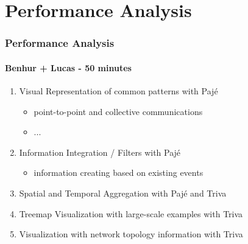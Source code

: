 \section{Performance Analysis}

\frame
{
  \frametitle{Performance Analysis}
  \framesubtitle{Benhur + Lucas - 50 minutes}

  \begin{enumerate}
  \item Visual Representation of common patterns with Paj\'e
    \begin{itemize}
    \item point-to-point and collective communications
    \item ...
    \end{itemize}
  \item Information Integration / Filters with Paj\'e
    \begin{itemize}
    \item information creating based on existing events
    \end{itemize}
  \item Spatial and Temporal Aggregation with Paj\'e and Triva
  \item Treemap Visualization with large-scale examples with Triva
  \item Visualization with network topology information with Triva
  \end{enumerate}
}
